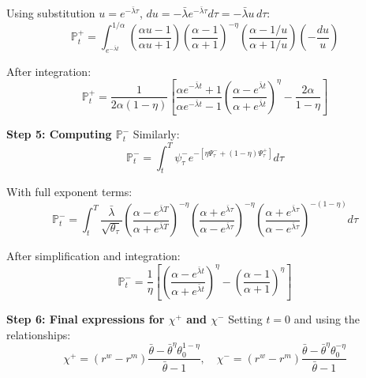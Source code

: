 Using substitution $u = e^{-\bar{\lambda}\tau}$, $du = -\bar{\lambda}e^{-\bar{\lambda}\tau}d\tau = -\bar{\lambda}u \, d\tau$:
\[
\mathbb{P}_t^+ = \int_{e^{-\bar{\lambda}t}}^{1/\alpha} \left(\frac{\alpha u - 1}{\alpha u + 1}\right) \left(\frac{\alpha - 1}{\alpha + 1}\right)^{-\eta} \left(\frac{\alpha - 1/u}{\alpha + 1/u}\right) \left(-\frac{du}{u}\right)
\]

After integration:
\[
\mathbb{P}_t^+ = \frac{1}{2\alpha(1-\eta)} \left[\frac{\alpha e^{-\bar{\lambda}t} + 1}{\alpha e^{-\bar{\lambda}t} - 1} \left(\frac{\alpha - e^{\bar{\lambda}t}}{\alpha + e^{\bar{\lambda}t}}\right)^{\eta} - \frac{2\alpha}{1-\eta}\right]
\]

\textbf{Step 5: Computing $\mathbb{P}_t^-$}
Similarly:
\[
\mathbb{P}_t^- = \int_t^T \psi_\tau^- e^{-[\eta\Psi_\tau^- + (1-\eta)\Psi_\tau^+]} d\tau
\]

With full exponent terms:
\[
\mathbb{P}_t^- = \int_t^T \frac{\bar{\lambda}}{\sqrt{\theta_\tau}} \left(\frac{\alpha - e^{\bar{\lambda}T}}{\alpha + e^{\bar{\lambda}T}}\right)^{-\eta} \left(\frac{\alpha + e^{\bar{\lambda}\tau}}{\alpha - e^{\bar{\lambda}\tau}}\right)^{-\eta} \left(\frac{\alpha + e^{\bar{\lambda}\tau}}{\alpha - e^{\bar{\lambda}\tau}}\right)^{-(1-\eta)} d\tau
\]

After simplification and integration:
\[
\mathbb{P}_t^- = \frac{1}{\eta}\left[\left(\frac{\alpha - e^{\bar{\lambda}t}}{\alpha + e^{\bar{\lambda}t}}\right)^{\eta} - \left(\frac{\alpha - 1}{\alpha + 1}\right)^{\eta}\right]
\]

\textbf{Step 6: Final expressions for $\chi^+$ and $\chi^-$}
Setting $t = 0$ and using the relationships:
\[
\chi^+ = (r^w - r^m)\frac{\bar{\theta} - \bar{\theta}^{\eta}\theta_0^{1-\eta}}{\bar{\theta} - 1}, \quad
\chi^- = (r^w - r^m)\frac{\bar{\theta} - \bar{\theta}^{\eta}\theta_0^{-\eta}}{\bar{\theta} - 1}
\]

